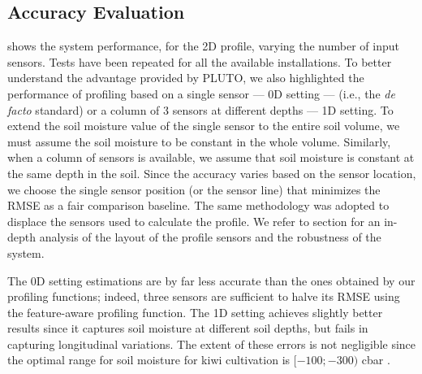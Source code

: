 \subsection{Accuracy Evaluation}
\label{pluto-sec:ApproachEvaluation}
 shows the system performance, for the 2D profile, varying the number of input sensors. Tests have been repeated for all the available installations.
To better understand the advantage provided by PLUTO, we also highlighted the performance of profiling based on a single sensor --- 0D setting --- (i.e., the \emph{de facto} standard) or a column of 3 sensors at different depths --- 1D setting. 
To extend the soil moisture value of the single sensor to the entire soil volume, we must assume the soil moisture to be constant in the whole volume. 
Similarly, when a column of sensors is available, we assume that soil moisture is constant at the same depth in the soil.
Since the accuracy varies based on the sensor location, we choose the single sensor position (or the sensor line) that minimizes the RMSE as a fair comparison baseline.
The same methodology was adopted to displace the sensors used to calculate the profile. 
We refer to section  for an in-depth analysis of the layout of the profile sensors and the robustness of the system.

The 0D setting estimations are by far less accurate than the ones obtained by our profiling functions; indeed, three sensors are sufficient to halve its RMSE using the feature-aware profiling function. 
The 1D setting achieves slightly better results since it captures soil moisture at different soil depths, but fails in capturing longitudinal variations. 
The extent of these errors is not negligible since the optimal range for soil moisture for kiwi cultivation is $[-100;-300)$ cbar \cite{miller1998effects}.

